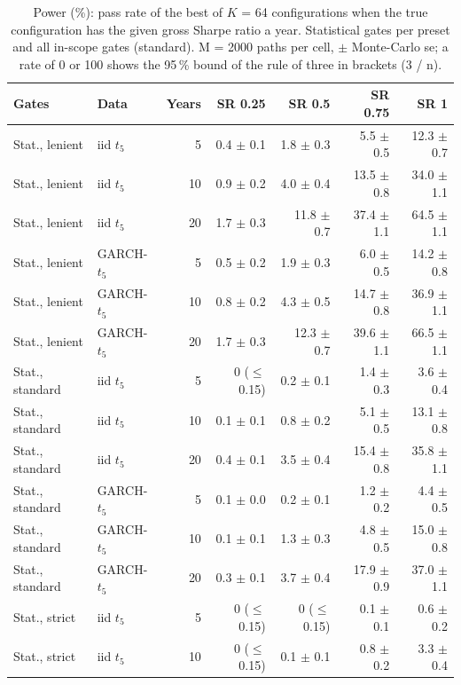 \begin{table}[H]
\centering
\scriptsize
\caption{Power (\%): pass rate of the best of $K$ = 64 configurations when the true configuration has the given gross Sharpe ratio a year. Statistical gates per preset and all in-scope gates (standard). M = 2000 paths per cell, $\pm$ Monte-Carlo se; a rate of 0 or 100 shows the 95\,\% bound of the rule of three in brackets (3 / n).}
\label{tab:O3_power}
\setlength{\tabcolsep}{3pt}
\begin{tabular}{llrrrrr}
\toprule
Gates & Data & Years & SR 0.25 & SR 0.5 & SR 0.75 & SR 1 \\
\midrule
Stat., lenient & iid $t_5$ & 5 & 0.4 $\pm$ 0.1 & 1.8 $\pm$ 0.3 & 5.5 $\pm$ 0.5 & 12.3 $\pm$ 0.7 \\
Stat., lenient & iid $t_5$ & 10 & 0.9 $\pm$ 0.2 & 4.0 $\pm$ 0.4 & 13.5 $\pm$ 0.8 & 34.0 $\pm$ 1.1 \\
Stat., lenient & iid $t_5$ & 20 & 1.7 $\pm$ 0.3 & 11.8 $\pm$ 0.7 & 37.4 $\pm$ 1.1 & 64.5 $\pm$ 1.1 \\
Stat., lenient & GARCH-$t_5$ & 5 & 0.5 $\pm$ 0.2 & 1.9 $\pm$ 0.3 & 6.0 $\pm$ 0.5 & 14.2 $\pm$ 0.8 \\
Stat., lenient & GARCH-$t_5$ & 10 & 0.8 $\pm$ 0.2 & 4.3 $\pm$ 0.5 & 14.7 $\pm$ 0.8 & 36.9 $\pm$ 1.1 \\
Stat., lenient & GARCH-$t_5$ & 20 & 1.7 $\pm$ 0.3 & 12.3 $\pm$ 0.7 & 39.6 $\pm$ 1.1 & 66.5 $\pm$ 1.1 \\
\midrule
Stat., standard & iid $t_5$ & 5 & 0 ($\le$ 0.15) & 0.2 $\pm$ 0.1 & 1.4 $\pm$ 0.3 & 3.6 $\pm$ 0.4 \\
Stat., standard & iid $t_5$ & 10 & 0.1 $\pm$ 0.1 & 0.8 $\pm$ 0.2 & 5.1 $\pm$ 0.5 & 13.1 $\pm$ 0.8 \\
Stat., standard & iid $t_5$ & 20 & 0.4 $\pm$ 0.1 & 3.5 $\pm$ 0.4 & 15.4 $\pm$ 0.8 & 35.8 $\pm$ 1.1 \\
Stat., standard & GARCH-$t_5$ & 5 & 0.1 $\pm$ 0.0 & 0.2 $\pm$ 0.1 & 1.2 $\pm$ 0.2 & 4.4 $\pm$ 0.5 \\
Stat., standard & GARCH-$t_5$ & 10 & 0.1 $\pm$ 0.1 & 1.3 $\pm$ 0.3 & 4.8 $\pm$ 0.5 & 15.0 $\pm$ 0.8 \\
Stat., standard & GARCH-$t_5$ & 20 & 0.3 $\pm$ 0.1 & 3.7 $\pm$ 0.4 & 17.9 $\pm$ 0.9 & 37.0 $\pm$ 1.1 \\
\midrule
Stat., strict & iid $t_5$ & 5 & 0 ($\le$ 0.15) & 0 ($\le$ 0.15) & 0.1 $\pm$ 0.1 & 0.6 $\pm$ 0.2 \\
Stat., strict & iid $t_5$ & 10 & 0 ($\le$ 0.15) & 0.1 $\pm$ 0.1 & 0.8 $\pm$ 0.2 & 3.3 $\pm$ 0.4 \\

\end{tabular}
\end{table}
